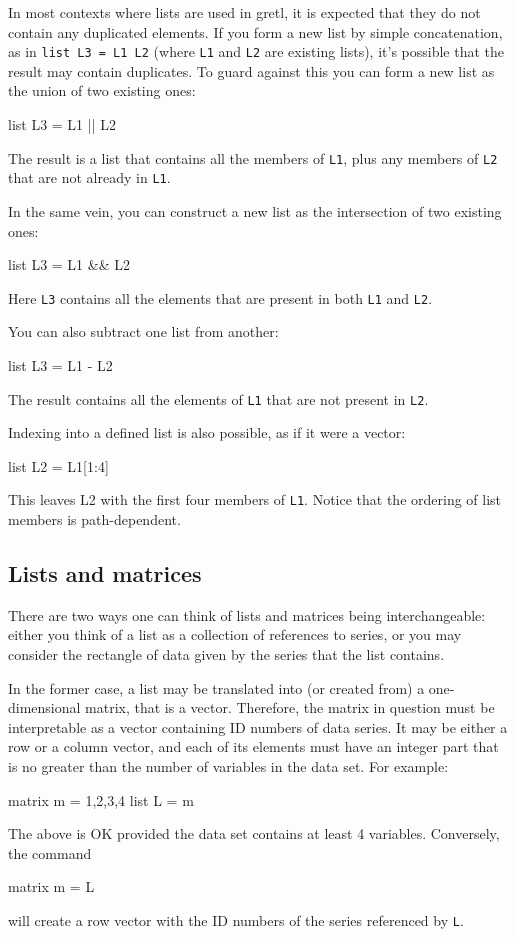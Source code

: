 In most contexts where lists are used in gretl, it is expected
that they do not contain any duplicated elements.  If you form a new
list by simple concatenation, as in \texttt{list L3 = L1 L2}
(where \texttt{L1} and \texttt{L2} are existing lists), it's possible
that the result may contain duplicates.  To guard against this you can
form a new list as the union of two existing ones:
%
\begin{code}
list L3 = L1 || L2
\end{code}
%
The result is a list that contains all the members of \texttt{L1},
plus any members of \texttt{L2} that are not already in \texttt{L1}.

In the same vein, you can construct a new list as the intersection of
two existing ones:
%
\begin{code}
list L3 = L1 && L2
\end{code}
%
Here \texttt{L3} contains all the elements that are present in both
\texttt{L1} and \texttt{L2}.

You can also subtract one list from another:
%
\begin{code}
list L3 = L1 - L2
\end{code}
%
The result contains all the elements of \texttt{L1} that are not 
present in \texttt{L2}.

Indexing into a defined list is also possible, as if it were a vector:
% 
\begin{code}
list L2 = L1[1:4]
\end{code}
%
This leaves L2 with the first four members of \texttt{L1}. Notice that
the ordering of list members is path-dependent. 

\subsection{Lists and matrices}

There are two ways one can think of lists and matrices being
interchangeable: either you think of a list as a collection of
references to series, or you may consider the rectangle of data given
by the series that the list contains.

In the former case, a list may be translated into (or created from) a
one-dimensional matrix, that is a vector. Therefore, the
matrix in question must be interpretable as a vector containing ID
numbers of data series.  It may be either a row or a column
vector, and each of its elements must have an integer part that is
no greater than the number of variables in the data set.  For example:
%
\begin{code}
matrix m = {1,2,3,4}
list L = m
\end{code}
%
The above is OK provided the data set contains at least 4
variables. Conversely, the command
%
\begin{code}
matrix m = L
\end{code}
%
will create a row vector with the ID numbers of the series referenced
by \texttt{L}.

